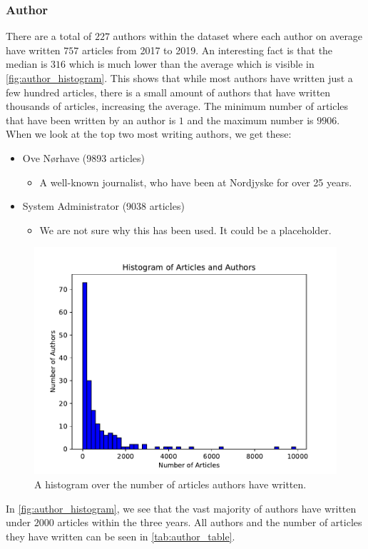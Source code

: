 \subsubsection{Author}\label{subsec:appendix_author}
There are a total of $227$ authors within the dataset where each author on average have written $757$ articles from 2017 to 2019.
An interesting fact is that the median is $316$ which is much lower than the average which is visible in \autoref{fig:author_histogram}.
This shows that while most authors have written just a few hundred articles, there is a small amount of authors that have written thousands of articles, increasing the average.
The minimum number of articles that have been written by an author is $1$ and the maximum number is $9906$.
When we look at the top two most writing authors, we get these:
\begin{itemize}
	\item Ove Nørhave (9893 articles)
	\begin{itemize}
		\item A well-known journalist, who have been at Nordjyske for over 25 years.
	\end{itemize}
	\item System Administrator (9038 articles)
	\begin{itemize}
		\item We are not sure why this has been used. It could be a placeholder.
	\end{itemize}
\end{itemize}

\begin{figure}
	\centering
	\includegraphics[width=.7\linewidth]{figures/author_hist_plot.pdf}
	\caption{A histogram over the number of articles authors have written.}
	\label{fig:author_histogram}
\end{figure}
In \autoref{fig:author_histogram}, we see that the vast majority of authors have written under $2000$ articles within the three years. 
All authors and the number of articles they have written can be seen in \autoref{tab:author_table}.

